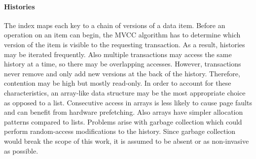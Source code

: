 \paragraph{Histories}

The index maps each key to a chain of versions of a data item. Before an
operation on an item can begin, the MVCC algorithm has to determine which
version of the item is visible to the requesting transaction. As a result,
histories may be iterated frequently. Also multiple transactions may access the
same history at a time, so there may be overlapping accesses. However,
transactions never remove and only add new versions at the back of the history.
Therefore, contention may be high but mostly read-only. In order to account for
these characteristics, an array-like data structure may be the most appropriate
choice as opposed to a list. Consecutive access in arrays is less likely to
cause page faults and can benefit from hardware prefetching. Also arrays have
simpler allocation patterns compared to lists. Problems arise with garbage
collection which could perform random-access modifications to the history. Since
garbage collection would break the scope of this work, it is assumed to be
absent or as non-invasive as possible.

